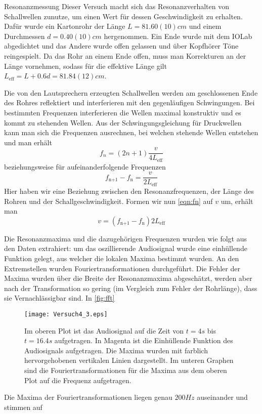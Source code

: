 \documentclass{alex_gp}
\begin{document}
\begin{mybox}{Resonanzmessung}
	Dieser Versuch macht sich das Resonanzverhalten von Schallwellen zunutze, um einen Wert für dessen Geschwindigkeit zu erhalten.
	Dafür wurde ein Kartonrohr der Länge \newline\( L = 81.60(10) \unit{cm} \) und einem Durchmessen \( d = 0.40(10) \unit{cm} \) hergenommen. Ein Ende wurde mit dem IOLab abgedichtet und das Andere wurde offen gelassen und über Kopfhörer Töne reingespielt. Da das Rohr an einem Ende offen, muss man Korrekturen an der Länge vornehmen, sodass für die effektive Länge gilt \( L_{\text{eff}} = L + 0.6d = 81.84(12) \unit{cm} \).
	
	Die von den Lautsprechern erzeugten Schallwellen werden am geschlossenen Ende des Rohres reflektiert und interferieren mit den gegenläufigen Schwingungen. Bei bestimmten Frequenzen interferieren die Wellen maximal konstruktiv und es kommt zu stehenden Wellen. Aus der Schwingungsgleichung für Druckwellen kann man sich die Frequenzen ausrechnen, bei welchen stehende Wellen entstehen und man erhält
	\begin{equation}\label{key}
		f_n = (2n+1)\frac{v}{4L_{\text{eff}}}
	\end{equation}
    beziehungsweise für aufeinanderfolgende Frequenzen
    \begin{equation}\label{eqn:fn}
    	f_{\text{n+1}} - f_{\text{n}} = \frac{v}{2L_{\text{eff}}}
    \end{equation}
	Hier haben wir eine Beziehung zwischen den Resonanzfrequenzen, der Länge des Rohren und der Schallgeschwindigkeit. Formen wir nun \autoref{eqn:fn} auf \( v \) um, erhält man
	\begin{equation}\label{eqn:cfn}
		v = \left(f_{\text{n+1}} - f_{\text{n}}\right) 2L_{\text{eff}}
	\end{equation}

	Die Resonanzmaxima und die dazugehörigen Frequenzen wurden wie folgt aus den Daten extrahiert: um das oszillierende Audiosignal wurde eine einhüllende Funktion gelegt, aus welcher die lokalen Maxima bestimmt wurden. An den Extremstellen wurden Fouriertransformationen durchgeführt. Die Fehler der Maxima wurden über die Breite der Resonanzmaxima abgeschätzt, werden aber nach der Transformation so gering (im Vergleich zum Fehler der Rohrlänge), dass sie Vernachlässigbar sind. In \autoref{fig:fft}
	
	\begin{figure}[H]	
		\centering
		\texttt{[image: Versuch4\_3.eps]}
		\caption{Im oberen Plot ist das Audiosignal auf die Zeit von \( t = 4 \unit{s} \) bis \( t = 16.4 \unit{s} \) aufgetragen. In Magenta ist die Einhüllende Funktion des Audiosignals aufgetragen. Die Maxima wurden mit farblich hervorgehobenen vertikalen Linien dargestellt. Im unteren Graphen sind die Fouriertransformationen für die Maxima aus dem oberen Plot auf die Frequenz aufgetragen.}
		\label{fig:fft}
	\end{figure}

	Die Maxima der Fouriertransformationen liegen genau \( 200 \unit{Hz} \) auseinander und stimmen auf 	
\end{mybox}
\end{document}

